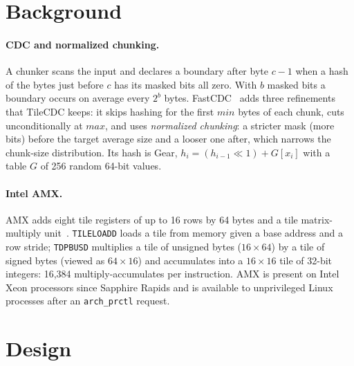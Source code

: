 \documentclass[10pt,twocolumn]{article}
\begin{document}
\section{Background}
\paragraph{CDC and normalized chunking.}
A chunker scans the input and declares a boundary after byte $c-1$ when a hash of the bytes just before $c$ has its masked bits all zero. With $b$ masked bits a boundary occurs on average every $2^b$ bytes. FastCDC~\cite{fastcdc16,fastcdc20} adds three refinements that TileCDC keeps: it skips hashing for the first $\textit{min}$ bytes of each chunk, cuts unconditionally at $\textit{max}$, and uses \emph{normalized chunking}: a stricter mask (more bits) before the target average size and a looser one after, which narrows the chunk-size distribution. Its hash is Gear, $h_i = (h_{i-1}\ll 1) + G[x_i]$ with a table $G$ of 256 random 64-bit values.

\paragraph{Intel AMX.}
AMX adds eight tile registers of up to 16 rows by 64 bytes and a tile matrix-multiply unit~\cite{intelisa}. \texttt{TILELOADD} loads a tile from memory given a base address and a row stride; \texttt{TDPBUSD} multiplies a tile of unsigned bytes ($16\times64$) by a tile of signed bytes (viewed as $64\times16$) and accumulates into a $16\times16$ tile of 32-bit integers: 16,384 multiply-accumulates per instruction. AMX is present on Intel Xeon processors since Sapphire Rapids and is available to unprivileged Linux processes after an \texttt{arch\_prctl} request.

\section{Design}\label{sec:design}
\end{document}
